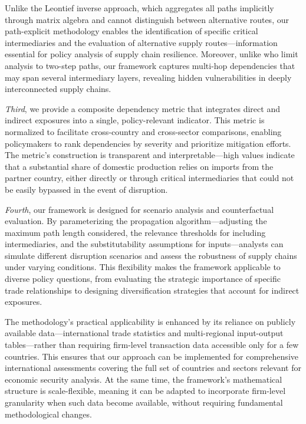 \documentclass[final,1p,times,authoryear]{elsarticle}
\begin{document}
Unlike the Leontief inverse approach, which aggregates all paths implicitly through matrix algebra and cannot distinguish between alternative routes, our path-explicit methodology enables the identification of specific critical intermediaries and the evaluation of alternative supply routes—information essential for policy analysis of supply chain resilience. Moreover, unlike \cite{Pourshahabi2024} who limit analysis to two-step paths, our framework captures multi-hop dependencies that may span several intermediary layers, revealing hidden vulnerabilities in deeply interconnected supply chains.

\textit{Third}, we provide a composite dependency metric that integrates direct and indirect exposures into a single, policy-relevant indicator. This metric is normalized to facilitate cross-country and cross-sector comparisons, enabling policymakers to rank dependencies by severity and prioritize mitigation efforts. The metric's construction is transparent and interpretable—high values indicate that a substantial share of domestic production relies on imports from the partner country, either directly or through critical intermediaries that could not be easily bypassed in the event of disruption.

\textit{Fourth}, our framework is designed for scenario analysis and counterfactual evaluation. By parameterizing the propagation algorithm—adjusting the maximum path length considered, the relevance thresholds for including intermediaries, and the substitutability assumptions for inputs—analysts can simulate different disruption scenarios and assess the robustness of supply chains under varying conditions. This flexibility makes the framework applicable to diverse policy questions, from evaluating the strategic importance of specific trade relationships to designing diversification strategies that account for indirect exposures.

The methodology's practical applicability is enhanced by its reliance on publicly available data—international trade statistics and multi-regional input-output tables—rather than requiring firm-level transaction data accessible only for a few countries. This ensures that our approach can be implemented for comprehensive international assessments covering the full set of countries and sectors relevant for economic security analysis. At the same time, the framework's mathematical structure is scale-flexible, meaning it can be adapted to incorporate firm-level granularity when such data become available, without requiring fundamental methodological changes.
\end{document}
